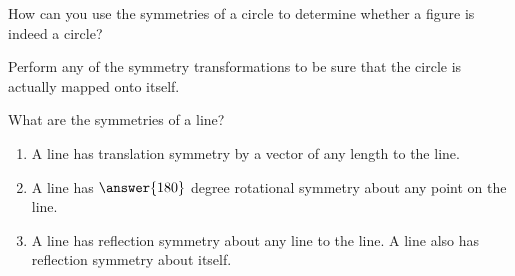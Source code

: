 \documentclass[nooutcomes]{ximera}
\begin{document}
\begin{question}
How can you use the symmetries of a circle to determine whether a figure is indeed a circle?  
\begin{freeResponse}
\end{freeResponse}
\begin{hint}
Perform any of the symmetry transformations to be sure that the circle is actually mapped onto itself.  
\end{hint}
\end{question}

\begin{question}
What are the symmetries of a line?  
\begin{selectAll}
\end{selectAll}
\begin{question}
\begin{enumerate}
\item A line has translation symmetry by a vector of any length  to the line.   
\item A line has $\answer{180}$ degree rotational symmetry about any point on the line.  
\item A line has reflection symmetry about any line  to the line.  A line also has reflection symmetry about itself.  
\end{enumerate}
\end{question}
\end{question}

\end{document}
